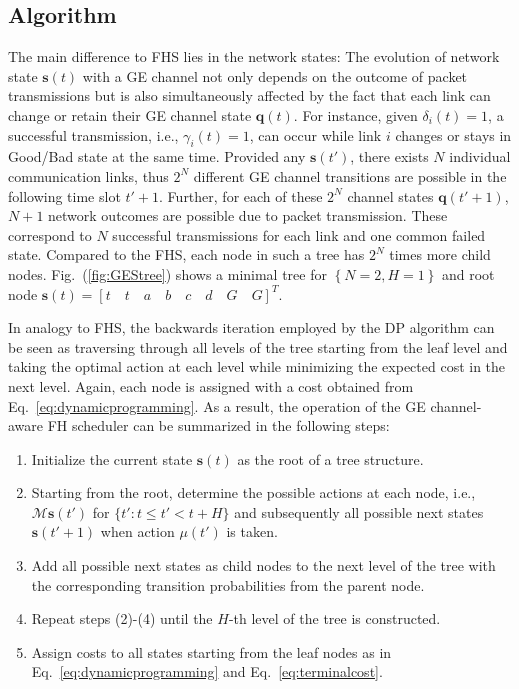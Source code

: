 \subsection{Algorithm}
The main difference to FHS lies in the network states: The evolution of network
state $\boldsymbol{s}(t)$ with a GE channel not only depends on the outcome of
packet transmissions but is also simultaneously affected by the fact that each
link can change or retain their GE channel state $\boldsymbol{q}(t) $. For
instance, given $\delta_i(t)=1$, a successful transmission, i.e.,
$\gamma_i(t)=1$, can occur while link $i$ changes or stays in Good/Bad state at
the same time. Provided any $\boldsymbol{s}(t')$, there exists $N$ individual
communication links, thus $2^N$ different GE channel transitions are possible in
the following time slot $t'+1$. Further, for each of these $2^N$ channel states
$\boldsymbol{q}(t'+1)$, $N+1$ network outcomes are possible due to packet
transmission. These correspond to $N$ successful transmissions for each link and
one common failed state. Compared to the FHS, each node in such a tree has $2^N$
times more child nodes. Fig.~(\ref{fig:GEStree}) shows a minimal tree for
$\left\{N=2, H=1\right\}$ and root node $\boldsymbol{s}(t)=\left[t\quad t\quad
a\quad b\quad c\quad d\quad G\quad G \right]^T$.

In analogy to FHS, the backwards iteration employed by the DP algorithm can be
seen as traversing through all levels of the tree starting from the leaf level
and taking the optimal action at each level while minimizing the expected cost
in the next level. Again, each node is assigned with a cost obtained from
Eq.~\eqref{eq:dynamicprogramming}. As a result, the operation of the GE
channel-aware FH scheduler can be summarized in the following steps:

\begin{enumerate}
	\item Initialize the current state $\boldsymbol{s}(t)$ as the root of a tree
	structure.
	\item Starting from the root, determine the possible actions at each node,
	i.e., $\mathcal{M}\boldsymbol{s}(t')$ for $\{t': t \leq t' < t + H \}$ and
	subsequently all possible next states $\boldsymbol{s}(t' + 1)$ when action
	$\mu(t')$ is taken.
	\item Add all possible next states as child nodes to the next level of the
	tree with the corresponding transition probabilities from the parent node.
	\item Repeat steps (2)-(4) until the $H$-th level of the tree is constructed.
	\item Assign costs to all states starting from the leaf nodes as in
	Eq.~\eqref{eq:dynamicprogramming} and Eq.~\eqref{eq:terminalcost}.
\end{enumerate}


